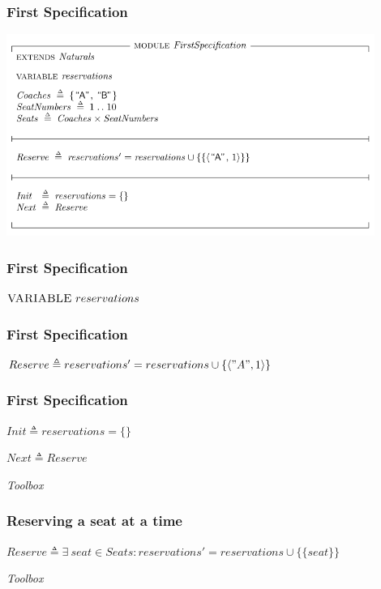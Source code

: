 \documentclass{beamer}
\begin{document}
\begin{frame}
  \frametitle{First Specification}
  
  \begin{center}
    \includegraphics[width=0.9\textwidth]{tla-introduction/first-specification}
  \end{center}
\end{frame}

\begin{frame}
  \frametitle{First Specification}
  
  $\textsc{VARIABLE}\ reservations$
\end{frame}

\begin{frame}
  \frametitle{First Specification}

  $Reserve \triangleq reservations' = reservations \cup \{\langle"A", 1\rangle\}$
\end{frame}

\begin{frame}
  \frametitle{First Specification}
  
  $Init \triangleq reservations = \{\}$
  
  $Next \triangleq Reserve$
\end{frame}

\begin{frame}
  \centering \Large \emph{Toolbox}
\end{frame}

\begin{frame}
  \frametitle{Reserving a seat at a time}

  $Reserve \triangleq \exists\ seat \in Seats : reservations' = reservations \cup \{\{seat\}\}$
\end{frame}

\begin{frame}
  \centering \Huge \emph{Toolbox}
\end{frame}
\end{document}
